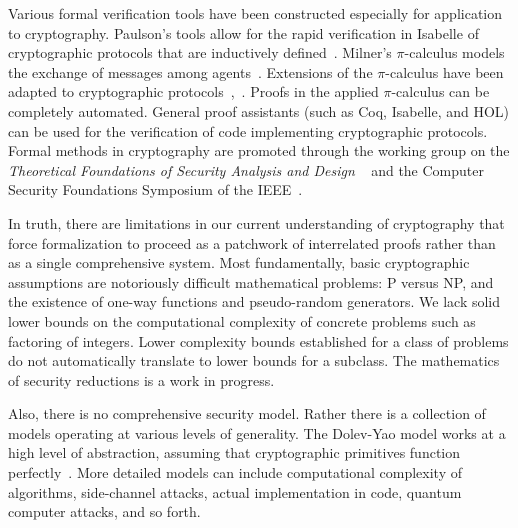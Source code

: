 \documentclass[11pt]{amsart} %
\begin{document}
Various formal verification tools have been constructed especially for application to cryptography.
Paulson's tools allow for the rapid verification in Isabelle of cryptographic protocols that are inductively defined~\cite{PaulsonXX}.  
Milner's $\pi$-calculus models the exchange of messages among
agents~\cite{RM99}.
Extensions of the $\pi$-calculus have been adapted to cryptographic protocols~\cite{AF},~\cite{SPI}.
Proofs in the applied $\pi$-calculus can be completely automated.
General proof assistants  (such as Coq, Isabelle, and HOL) can be used for the verification of code implementing
cryptographic protocols.
Formal methods in cryptography are promoted through 
the working group on the {\it Theoretical Foundations of Security
Analysis and Design}
~\cite{TFSAD}
\cite{FOSAD}
and the Computer Security Foundations Symposium of the IEEE~\cite{CSF2013}.

In truth, there are limitations in our current understanding of cryptography that force
formalization to proceed as a patchwork of interrelated proofs rather than as a single comprehensive system.
Most fundamentally, basic cryptographic assumptions are notoriously difficult mathematical
problems: P versus NP,  and the existence of one-way functions and pseudo-random generators.
We lack solid lower bounds on the computational complexity of concrete problems such as
factoring of integers.
Lower complexity bounds established for a class of
problems do not automatically translate to lower bounds for a subclass.
The mathematics of security reductions is a work in progress.

Also, there is no comprehensive security model.  Rather there is a collection of models operating at various
levels of generality.
The Dolev-Yao model works at a high level of abstraction, assuming that cryptographic primitives function perfectly~\cite{DY}.
More detailed models can include computational complexity of algorithms,
side-channel attacks, actual implementation in code, quantum computer attacks, and so forth.
\end{document}
